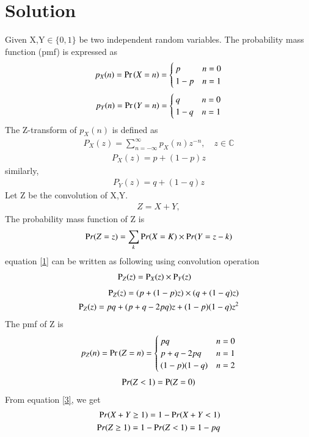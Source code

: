 \documentclass[journal,12pt,twocolumn]{IEEEtran}
\begin{document}
\section*{Solution}
Given X,Y$\in \{0,1\}$ be two independent random variables. The probability mass function (pmf) is expressed  as 
\begin{align}
    p_{X}(n) = \Pr\left(X = n\right) = 
\begin{cases}
p & n=0
\\
1-p & n=1
\end{cases}\label{1}
\end{align}
\begin{align}
    p_{Y}(n) = \Pr\left(Y = n\right) = 
\begin{cases}
q & n=0
\\
1-q & n=1
\end{cases}\label{1}
\end{align}
The Z-transform of $p_X(n)$ is defined as
\begin{align}
P_X(z) = \sum_{n = -\infty}^{\infty}p_X(n)z^{-n}, \quad z \in \mathbb{C}
\label{7}
\end{align}
\begin{align}
P_X(z) = p+(1-p)z
\end{align}
similarly,
\begin{align}
P_Y(z) = q+(1-q)z    
\end{align}
Let Z be the convolution of X,Y.
\begin{align}
  Z=X+Y,
  \end{align}
  The probability mass function of Z is \\
  \begin{align}
  \mbox Pr(Z = z) = \sum_{k}\mbox Pr(X = K)\times \mbox Pr(Y = z-k) \label{1}
  \end{align}
  equation  \eqref{1} can be written as following using convolution operation
    \begin{align}
     \mbox P_Z(z) &= \mbox P_{X}(z)\times \mbox P_{Y}(z)  
    \end{align}
    \begin{align}
    \mbox P_Z(z)=(p+(1-p)z)\times(q+(1-q)z)\\
    \mbox P_Z(z)= pq+(p+q-2pq)z+(1-p)(1-q)z^2     
    \end{align}
    The pmf of Z is 
\begin{align}
    p_{Z}(n) = \Pr\left(Z = n\right) = 
\begin{cases}
pq & n=0
\\
p+q-2pq & n=1\\
(1-p)(1-q) & n=2
\end{cases}\label{2}
\end{align}
\begin{align}
  \mbox Pr(Z<1) = \mbox P(Z=0)  \label{3} 
  \end{align}
  From equation \eqref{3}, we get
\begin{align}
  \mbox Pr(X+Y\geq1) = 1 - \mbox Pr(X+Y<1)\\
  \mbox Pr(Z\geq1)= 1-\mbox Pr(Z<1) = 1-pq   
\end{align}
\end{document}
